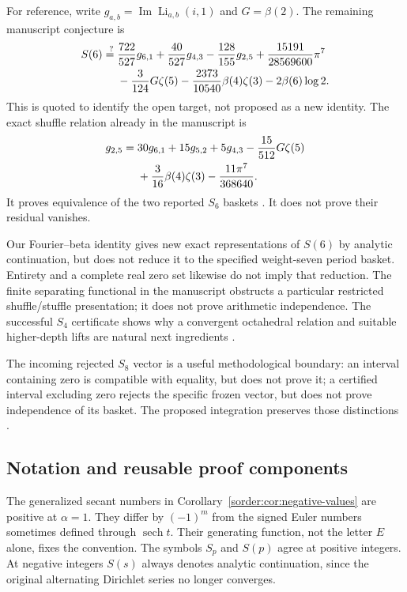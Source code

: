 \documentclass[11pt,a4paper]{article}
\theoremstyle{definition}
\theoremstyle{remark}
\newcommand{\sech}{\operatorname{sech}}
\numberwithin{equation}{section}
\begin{document}
For reference, write
$g_{a,b}=\operatorname{Im}\operatorname{Li}_{a,b}(i,1)$ and
$G=\beta(2)$. The remaining manuscript conjecture is
\begin{align}
 S(6)\stackrel{?}{={}}&
 \frac{722}{527}g_{6,1}+\frac{40}{527}g_{4,3}
 -\frac{128}{155}g_{2,5}+\frac{15191}{28569600}\pi^7
 \notag\\
 &-\frac3{124}G\zeta(5)
 -\frac{2373}{10540}\beta(4)\zeta(3)
 -2\beta(6)\log2 .
 \label{eq:retained-S6}
\end{align}
This is quoted to identify the open target, not proposed as a new
identity. The exact shuffle relation already in the manuscript is
\begin{align}
 g_{2,5}={}&30g_{6,1}+15g_{5,2}+5g_{4,3}
 -\frac{15}{512}G\zeta(5)\notag\\
 &+\frac3{16}\beta(4)\zeta(3)-\frac{11\pi^7}{368640}.
 \label{eq:retained-basket-change}
\end{align}
It proves equivalence of the two reported $S_6$ baskets
\cite{ProjectQuotients}. It does not prove their residual vanishes.

Our Fourier--beta identity gives new exact representations of $S(6)$
by analytic continuation, but does not reduce it to the specified
weight-seven period basket. Entirety and a complete real zero set
likewise do not imply that reduction. The finite separating functional
in the manuscript obstructs a particular restricted
shuffle/stuffle presentation; it does not prove arithmetic independence.
The successful $S_4$ certificate shows why a convergent octahedral
relation and suitable higher-depth lifts are natural next ingredients
\cite{ProjectS4,ProjectQuotients}.

The incoming rejected $S_8$ vector is a useful methodological boundary:
an interval containing zero is compatible with equality, but does not
prove it; a certified interval excluding zero rejects the specific
frozen vector, but does not prove independence of its basket.
The proposed integration preserves those distinctions
\cite{ProjectDiscovery}.

\subsection{Notation and reusable proof components}

The generalized secant numbers in
Corollary~\ref{sorder:cor:negative-values} are positive at $\alpha=1$.
They differ by $(-1)^m$ from the signed Euler numbers sometimes defined
through $\sech t$. Their generating function, not the letter $E$ alone,
fixes the convention.
The symbols $S_p$ and $S(p)$ agree at positive integers. At negative
integers $S(s)$ always denotes analytic continuation, since the
original alternating Dirichlet series no longer converges.
\end{document}
